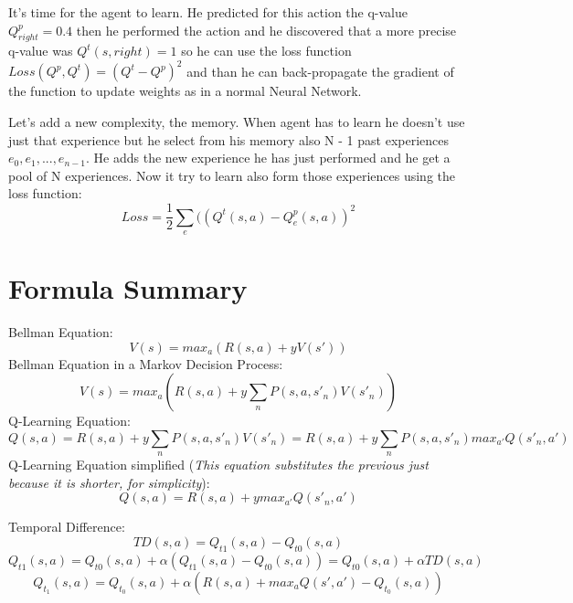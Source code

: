 It's time for the agent to learn. He predicted for this action the q-value $Q^p_{right} = 0.4$ then he performed the action and he discovered that a more precise q-value was $Q^t(s,right) = 1$ so he can use the loss function $Loss(Q^p, Q^t) = (Q^t - Q^p)^2$ and than he can back-propagate the gradient of the function to update weights as in a normal Neural Network.

 Let's add a new complexity, the memory. When agent has to learn he doesn't use just that experience but he select from his memory also N - 1 past experiences $e_0, e_1,..., e_{n - 1}$. He adds the new experience he has just performed and he get a pool of N experiences. Now it try to learn also form those experiences using the loss function:
 \begin{equation}
 Loss = \frac{1}{2} \sum_e ((Q^t(s,a) - Q^p_e(s,a))^2
 \end{equation}
 \newpage
 \section{Formula Summary}
 Bellman Equation:
 \begin{equation}
 V(s) = max_a(R(s,a) + yV(s'))
 \end{equation}
 Bellman Equation in a Markov Decision Process:
 \begin{equation}
 V(s) = max_a(R(s,a) + y \sum_n P(s,a,s'_n)V(s'_n))
 \end{equation}
 Q-Learning Equation:
 \begin{equation}
 Q(s,a) = R(s,a) + y \sum_n P(s,a,s'_n)V(s'_n) = R(s,a) + y \sum_n P(s,a,s'_n)max_{a'}Q(s'_n, a')
 \end{equation}
 Q-Learning Equation simplified (\textit{This equation substitutes the previous just because it is shorter, for simplicity}):
  \begin{equation}
 Q(s,a) = R(s,a) + ymax_{a'}Q(s'_n, a')
 \end{equation}
 
 
 
 Temporal Difference:
 \begin{equation}
 TD(s,a) = Q_{t1}(s,a) - Q_{t0}(s,a)
 \end{equation}
 \begin{equation}
 Q_{t1}(s,a) = Q_{t0}(s,a) +\alpha(Q_{t1}(s,a) - Q_{t0}(s,a)) =  Q_{t0}(s,a) +\alpha TD(s,a)
 \end{equation}
 \begin{equation}
 Q_{t_1}(s,a) = Q_{t_0}(s,a) + \alpha(R(s,a) + max_a Q(s',a') - Q_{t_0}(s,a))
 \end{equation}
 